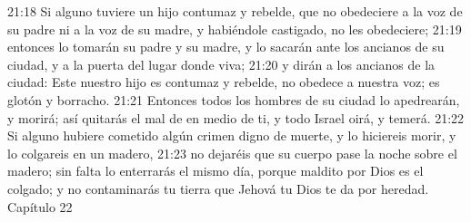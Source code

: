 21:18 Si alguno tuviere un hijo contumaz y rebelde, que no obedeciere a la voz de su padre ni a la voz de su madre, y habiéndole castigado, no les obedeciere;  
21:19 entonces lo tomarán su padre y su madre, y lo sacarán ante los ancianos de su ciudad, y a la puerta del lugar donde viva;  
21:20 y dirán a los ancianos de la ciudad: Este nuestro hijo es contumaz y rebelde, no obedece a nuestra voz; es glotón y borracho.  
21:21 Entonces todos los hombres de su ciudad lo apedrearán, y morirá; así quitarás el mal de en medio de ti, y todo Israel oirá, y temerá.  
21:22 Si alguno hubiere cometido algún crimen digno de muerte, y lo hiciereis morir, y lo colgareis en un madero,  
21:23 no dejaréis que su cuerpo pase la noche sobre el madero; sin falta lo enterrarás el mismo día, porque maldito por Dios es el colgado; y no contaminarás tu tierra que Jehová tu Dios te da por heredad.  
Capítulo 22 

